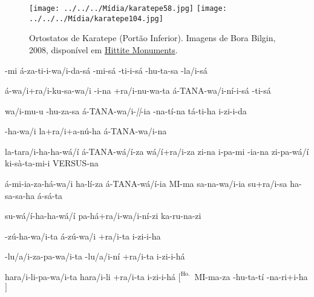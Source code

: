 \begin{figure}
	\begin{center}
		\texttt{[image: ../../../Mídia/karatepe58.jpg]}
		\texttt{[image: ../../../Mídia/karatepe104.jpg]}
	\end{center}
	\caption[Ortostatos de Karatepe (Portão Inferior)]{Ortostatos de Karatepe
		(Portão Inferior).
		Imagens de Bora Bilgin, 2008, disponível em
		\href{https://www.hittitemonuments.com/karatepe}{Hittite Monuments}.
	}\label{fig:karatepe_a}
\end{figure}



\clearpage
\begin{parnumbersr}

	\raggedright%
	\itshape%

	\lmasc{}-mi
	\spac{}á-za-ti-i-wa/i-da-sá
	-mi-sá
	-ti-i-sá
	-hu-ta-sa
	-la/i-sá

	á-wa/i+ra/i-ku-sa-wa/i
	\lbreak{}
	-i-na
	+ra/i-nu-wa-ta
	á-TANA-wa/i-ní-i-sá
	-ti-sá

	wa/i-mu-u
	-hu-za-sa á-TANA-wa/i-\emph{||}-ia
	-na-tí-na tá-ti-ha i-zi-i-da

	\lmasc{}-ha-wa/i
	\lmasc{}la+ra/i+a-nú-ha
	\lmasc{}á-TANA-wa/i-na

	\lmasc{}la-tara/i-ha-ha-wá/í
	\lmasc{}á-TANA-wá/í-za \lmasc{}wá/í+ra/i-za
	\lmasc{}zi-na \lmasc{}i-pa-mi \lmasc{}-ia-na
	\lmasc{}zi-pa-wá/í ki-sà-ta-mi-i \lmasc{}VERSUS-na

	\lmasc{}á-mi-ia-za-há-wa/i ha-lí-za
	\lmasc{}á-TANA-wá/í-ia \lmasc{}MI-ma
	sa-na-wa/i-ia \lmasc{}su+ra/i-sa
	\lmasc{}ha-sa-sa-ha á-sá-ta


	\lmasc{}su-wá/í-ha-ha-wá/í
	\lmasc{}pa-há+ra/i-wa/i-ní-zi
	\lmasc{}ka-ru-na-zi

	\lmasc{}-zú-ha-wa/i-ta á-zú-wa/i
	\lmasc{}+ra/i-ta \lmasc{}i-zi-i-ha

	-lu/a/i-za-pa-wa/i-ta \lmasc{}-lu/a/i-ní
	\lmasc{}+ra/i-ta \lmasc{}i-zi-i-há

	\lmasc{}hara/i-li-pa-wa/i-ta
	\lmasc{}hara/i-li \lmasc{}+ra/i-ta
	\lmasc{}i-zi-i-há $[^\text{Ho.}$\ MI-ma-za
					\lmasc{}-hu-ta-tí -na-ri+i-ha$]$


\end{parnumbersr}


